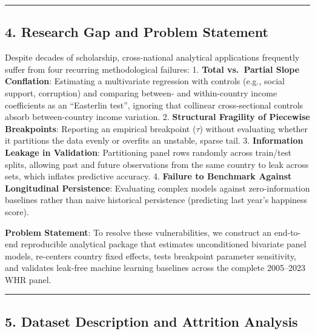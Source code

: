 \documentclass[
]{article}
\begin{document}
\begin{center}\rule{0.5\linewidth}{0.5pt}\end{center}

\hypertarget{research-gap-and-problem-statement}{%
\subsection{4. Research Gap and Problem
Statement}\label{research-gap-and-problem-statement}}

Despite decades of scholarship, cross-national analytical applications
frequently suffer from four recurring methodological failures: 1.
\textbf{Total vs.~Partial Slope Conflation}: Estimating a multivariate
regression with controls (e.g., social support, corruption) and
comparing between- and within-country income coefficients as an
``Easterlin test'', ignoring that collinear cross-sectional controls
absorb between-country income variation. 2. \textbf{Structural Fragility
of Piecewise Breakpoints}: Reporting an empirical breakpoint (\(\tau\))
without evaluating whether it partitions the data evenly or overfits an
unstable, sparse tail. 3. \textbf{Information Leakage in Validation}:
Partitioning panel rows randomly across train/test splits, allowing past
and future observations from the same country to leak across sets, which
inflates predictive accuracy. 4. \textbf{Failure to Benchmark Against
Longitudinal Persistence}: Evaluating complex models against
zero-information baselines rather than naive historical persistence
(predicting last year's happiness score).

\textbf{Problem Statement}: To resolve these vulnerabilities, we
construct an end-to-end reproducible analytical package that estimates
unconditioned bivariate panel models, re-centers country fixed effects,
tests breakpoint parameter sensitivity, and validates leak-free machine
learning baselines across the complete 2005--2023 WHR panel.

\begin{center}\rule{0.5\linewidth}{0.5pt}\end{center}

\hypertarget{dataset-description-and-attrition-analysis}{%
\subsection{5. Dataset Description and Attrition
Analysis}\label{dataset-description-and-attrition-analysis}}
\end{document}
